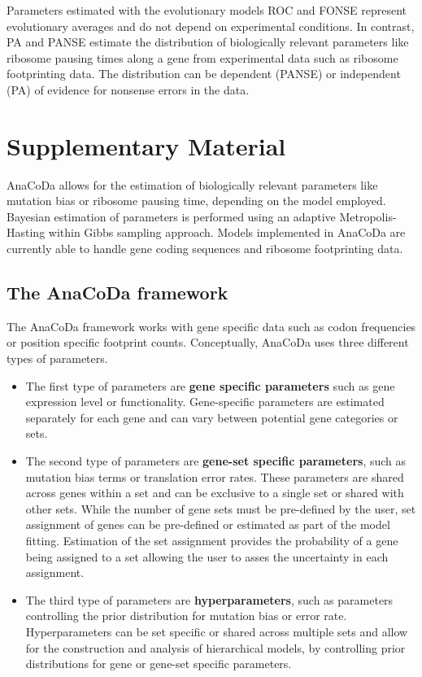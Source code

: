 Parameters estimated with the evolutionary models ROC and FONSE represent evolutionary averages and do not depend on experimental conditions. 
In contrast, PA and PANSE estimate the distribution of biologically relevant parameters like ribosome pausing times along a gene from experimental data such as ribosome footprinting data. 
The distribution can be dependent (PANSE) or independent (PA) of evidence for nonsense errors in the data.  


\section{Supplementary Material}
AnaCoDa allows for the estimation of biologically relevant parameters like mutation bias or ribosome pausing
time, depending on the model employed. Bayesian estimation of parameters is performed using an adaptive
Metropolis-Hasting within Gibbs sampling approach. Models implemented in AnaCoDa are currently able to
handle gene coding sequences and ribosome footprinting data.

\subsection{The AnaCoDa framework}
The AnaCoDa framework works with gene specific data such as codon frequencies or position specific footprint
counts. Conceptually, AnaCoDa uses three different types of parameters.

\begin{itemize}
	\item The first type of parameters are \textbf{gene specific parameters} such as gene expression level or functionality.
Gene-specific parameters are estimated separately for each gene and can vary between potential gene
categories or sets.
	\item The second type of parameters are \textbf{gene-set specific parameters}, such as mutation bias terms or
translation error rates. These parameters are shared across genes within a set and can be exclusive to a
single set or shared with other sets. While the number of gene sets must be pre-defined by the user, set
assignment of genes can be pre-defined or estimated as part of the model fitting. Estimation of the set
assignment provides the probability of a gene being assigned to a set allowing the user to asses the
uncertainty in each assignment.
	\item The third type of parameters are \textbf{hyperparameters}, such as parameters controlling the prior distribution
for mutation bias or error rate. Hyperparameters can be set specific or shared across multiple sets
and allow for the construction and analysis of hierarchical models, by controlling prior distributions for
gene or gene-set specific parameters.
\end{itemize}

